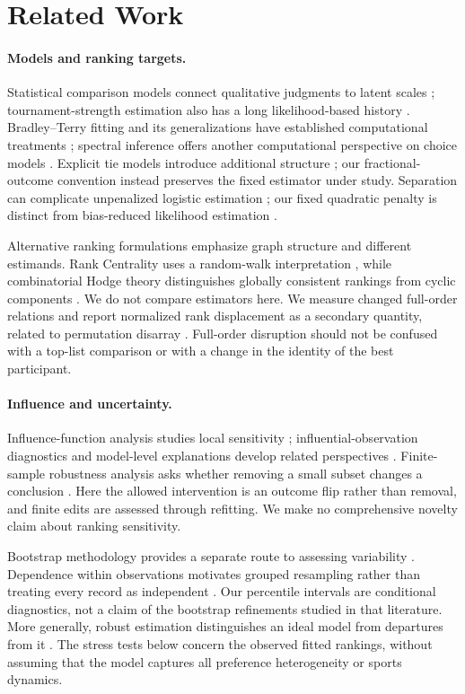 \documentclass{article}
\begin{document}
\section{Related Work}
\paragraph{Models and ranking targets.}
Statistical comparison models connect qualitative judgments to latent scales \citep{Thurstone1927}; tournament-strength estimation also has a long likelihood-based history \citep{Zermelo1929}. Bradley--Terry fitting and its generalizations have established computational treatments \citep{Hunter2004,Turner2012}; spectral inference offers another computational perspective on choice models \citep{Maystre2015}. Explicit tie models introduce additional structure \citep{Rao1967,Davidson1970}; our fractional-outcome convention instead preserves the fixed estimator under study. Separation can complicate unpenalized logistic estimation \citep{Albert1984}; our fixed quadratic penalty is distinct from bias-reduced likelihood estimation \citep{Firth1993}.

Alternative ranking formulations emphasize graph structure and different estimands. Rank Centrality uses a random-walk interpretation \citep{Negahban2017}, while combinatorial Hodge theory distinguishes globally consistent rankings from cyclic components \citep{Jiang2011}. We do not compare estimators here. We measure changed full-order relations and report normalized rank displacement as a secondary quantity, related to permutation disarray \citep{Diaconis1977}. Full-order disruption should not be confused with a top-list comparison \citep{Fagin2003} or with a change in the identity of the best participant.

\paragraph{Influence and uncertainty.}
Influence-function analysis studies local sensitivity \citep{Hampel1974}; influential-observation diagnostics and model-level explanations develop related perspectives \citep{Cook1977,Koh2017}. Finite-sample robustness analysis asks whether removing a small subset changes a conclusion \citep{Broderick2020}. Here the allowed intervention is an outcome flip rather than removal, and finite edits are assessed through refitting. We make no comprehensive novelty claim about ranking sensitivity.

Bootstrap methodology provides a separate route to assessing variability \citep{Efron1979,Efron1986,Davison1997}. Dependence within observations motivates grouped resampling rather than treating every record as independent \citep{Cameron2008}. Our percentile intervals are conditional diagnostics, not a claim of the bootstrap refinements studied in that literature. More generally, robust estimation distinguishes an ideal model from departures from it \citep{Huber1964}. The stress tests below concern the observed fitted rankings, without assuming that the model captures all preference heterogeneity or sports dynamics.
\end{document}
